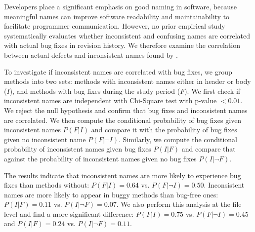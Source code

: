 Developers place a significant emphasis on good naming in software, because meaningful names can improve software readability and maintainability to facilitate programmer communication. However, no prior empirical study systematically evaluates whether inconsistent and confusing names are correlated with actual bug fixes in revision history. We therefore examine the correlation between actual defects and inconsistent names found by \niche. 

To investigate if inconsistent names are correlated with bug fixes, we group methods into two sets: methods with inconsistent names either in header or body ($I$), and methods with bug fixes during the study period ($F$). We first check if inconsistent names are independent with Chi-Square test with p-value $<0.01$. We reject the null hypothesis and confirm that bug fixes and inconsistent names are correlated.  We then compute the conditional probability of bug fixes given inconsistent names $P(F|I)$ and compare it with the probability of bug fixes given no inconsistent name $P(F|\neg I)$. Similarly, we compute the conditional probability of inconsistent names given bug fixes $P(I|F)$ and compare that against the probability of inconsistent names given no bug fixes $P(I|\neg F)$. 

The results indicate that inconsistent names are more likely to experience bug fixes than methods without: $P(F|I)=0.64$ vs.  $P(F|\neg I)=0.50$. Inconsistent names are more likely to appear in buggy methods than bug-free ones: $P(I|F)=0.11$ vs. $P(I|\neg F)=0.07$. We also perform this analysis at the file level and find a more significant difference:   $P(F|I)=0.75$ vs.  $P(F|\neg I)=0.45$ and $P(I|F)=0.24$ vs. $P(I|\neg F)=0.11$.


